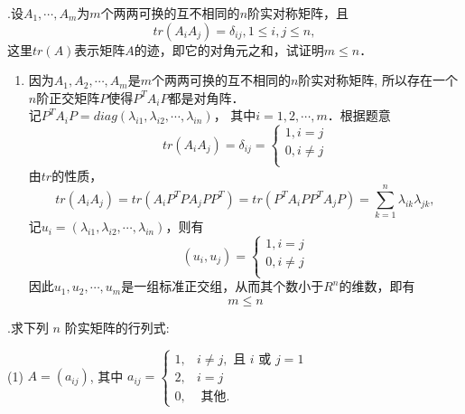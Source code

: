\documentclass{article}
\begin{document}
\vspace{1ex}
{.}设$A_1,\cdots,A_m$为$m$个两两可换的互不相同的$n$阶实对称矩阵，且
$$tr(A_i A_j)=\delta_{ij},1\leq i,j\leq n,$$
\qquad 这里$tr(A)$表示矩阵$A$的迹，即它的对角元之和，试证明$m\leq n$．
\begin{enumerate}[\qquad 证明：]
    \item 因为$A_1,A_2,\cdots,A_m$是$m$个两两可换的互不相同的$n$阶实对称矩阵,
          所以存在一个$n$阶正交矩阵$P$使得${P^T}{A_i}P$都是对角阵．\\
          记${P^T}{A_i}P=diag(\lambda_{i1},\lambda_{i2},\cdots,\lambda_{in})$，
          其中$i=1,2,\cdots,m$．根据题意
          \begin{equation*}
              tr(A_i A_j)=\delta_{ij}=
              \left\{
              \begin{array}{ccc}
                  1,i=j     \\
                  0,i\neq j \\
              \end{array}
              \right.
          \end{equation*}
          由$tr$的性质，
          $$tr(A_i A_j)=tr({A_i}{P^T}P{A_j}P{P^T})=tr({P^T}{A_i}P{P^T}{A_j}P)=\sum\limits_{k=1}^{n}\lambda_{ik}\lambda_{jk},$$
          记$u_i=(\lambda_{i1},\lambda_{i2},\cdots,\lambda_{in})$，则有
          \begin{equation*}
              (u_i,u_j)=
              \left\{
              \begin{array}{ccc}
                  1,i=j     \\
                  0,i\neq j \\
              \end{array}
              \right.
          \end{equation*}
          因此$u_1,u_2,\cdots,u_m$是一组标准正交组，从而其个数小于$R^n$的维数，即有
          $$m\leq n$$
\end{enumerate}

\vspace{1ex}
{.}求下列 $n$ 阶实矩阵的行列式:

(1) $A=\left(a_{i j}\right)$, 其中 $a_{i j}=\left\{\begin{array}{lr}
        1, & i \neq j, \text { 且 } i \text { 或 } j=1 \\
        2, & i=j                                       \\
        0, & \text { 其他. }
    \end{array}\right.$
\end{document}
